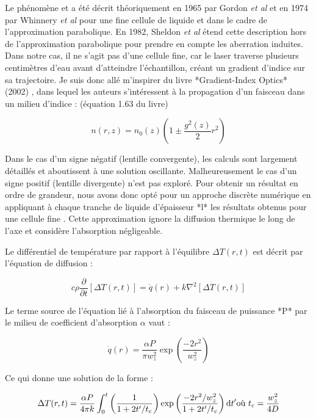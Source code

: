 
Le phénomène et a été décrit théoriquement en 1965 par Gordon \emph{et al} \cite{gordon_longtransient_1965} et en 1974 par Whinnery \emph{et al} \cite{whinnery_laser_1974} pour une fine cellule de liquide et dans le cadre de l'approximation parabolique. En 1982, Sheldon \emph{et al} \cite{sheldon_laser-induced_1982} étend cette description hors de l'approximation parabolique pour prendre en compte les aberration induites. Dans notre cas, il ne s'agit pas d'une cellule fine, car le laser traverse plusieurs centimètres d'eau avant d'atteindre l'échantillon, créant un gradient d'indice sur sa trajectoire. Je suis donc allé m'inspirer du livre *Gradient-Index Optics* (2002) \cite{gomez-reino_gradient-index_2002}, dans lequel les auteurs s'intéressent à la propagation d'un faisceau dans un milieu d'indice : (équation 1.63 du livre)

$$
n(r,z) = n_0(z) \left( 1 \pm \frac{g^2(z)}{2}r^2\right)
$$

Dans le cas d'un signe négatif (lentille convergente), les calculs sont largement détaillés et aboutissent à une solution oscillante. Malheureusement le cas d'un signe positif (lentille divergente) n'est pas exploré. Pour obtenir un résultat en ordre de grandeur, nous avons donc opté pour un approche discrète numérique en appliquant à chaque tranche de liquide d'épaisseur *l* les résultats obtenus pour une cellule fine \cite{gordon_longtransient_1965}\cite{whinnery_laser_1974}. Cette approximation ignore la diffusion thermique le long de l'axe et considère l'absorption négligeable.

Le différentiel de température par rapport à l'équilibre $\Delta T(r,t)$ est décrit par l'équation de diffusion :

$$
c\rho\frac{\partial}{\partial t}[\Delta T(r,t)] = \dot{q}(r) + k \nabla^2[\Delta T(r,t)]
$$

Le terme source de l'équation lié à l'absorption du faisceau de puissance *P* par le milieu de coefficient d'absorption $\alpha$ vaut :

$$
\dot{q}(r) = \frac{\alpha P}{\pi w^2_z}\exp \left(\frac{-2r^2}{w^2_z} \right)
$$

Ce qui donne une solution de la forme :

$$
\Delta T(r,t) = \frac{\alpha P}{4\pi k} \int_0^t \left( \frac{1}{1+2t'/t_c} \right) \exp \left( \frac{-2r^2/w_z^2}{1+2t'/t_c} \right) \mathrm{d}t'
\\
\text{où} \ t_c = \frac{w_z^2}{4D}
$$

